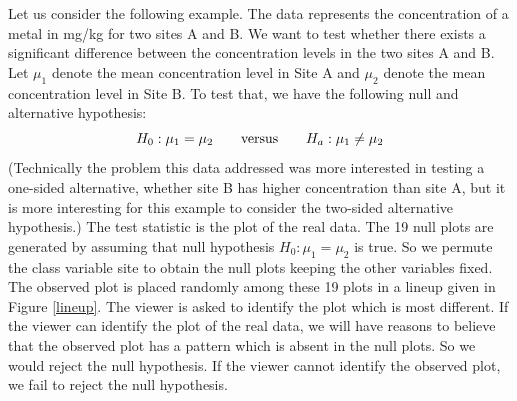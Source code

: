 Let us consider the following example. The data represents the concentration of a metal in mg/kg for two sites A and B.
We want to test whether there exists a significant difference between the concentration levels in the two sites A and B. Let $\mu_1$ denote the mean concentration level in Site A and $\mu_2$ denote the mean concentration level in Site B. To test that, we have the following null and alternative hypothesis:
\[
H_0: \mu_1 = \mu_2 \qquad \hbox{versus} \qquad H_a: \mu_1 \ne \mu_2
\]
(Technically the problem this data addressed was more interested in testing a one-sided alternative, whether site B has higher concentration than site A, but it is more interesting for this example to consider the two-sided alternative hypothesis.) The test statistic is the plot of the real data. The 19 null plots are generated by assuming that null hypothesis $H_0: \mu_1 =  \mu_2$ is true. So we permute the class variable site to obtain the null plots keeping the other variables fixed. The observed plot is placed randomly among these 19 plots in a lineup given in Figure \ref{lineup}. The viewer is asked to identify the plot which is most different. If the viewer can identify the plot of the real data, we will have reasons to believe that the observed plot has a pattern which is absent in the null plots. So we would reject the null hypothesis. If the viewer cannot identify the observed plot, we fail to reject the null hypothesis. 

